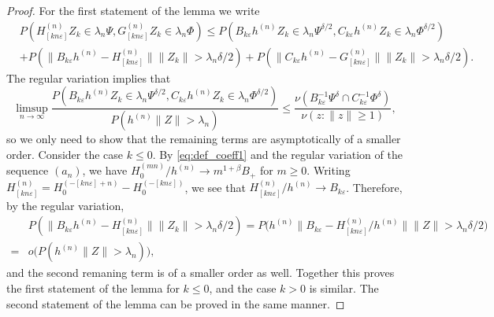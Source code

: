 \documentclass[11pt,reqno]{amsart}
\numberwithin{equation}{section}
\theoremstyle{definition}
\theoremstyle{remark}
\theoremstyle{definition}
\newcommand{\eps}{\varepsilon}
\begin{document}
 
\begin{proof}
For the first statement of the lemma we write 
         \begin{align*}
             & P(H_{[kn\eps]}^{(n)}Z_k \in \lambda_n \Psi, G_{[kn\eps]}^{(n)} Z_k \in \lambda_n \Phi) \leq P(B_{k\eps}
            h^{(n)} Z_k \in \lambda_n \Psi^{\delta/2}, C_{k\eps}h^{(n)}Z_k \in \lambda_n \Phi^{\delta/2})\\
            & + P(\|B_{k\eps}
              h^{(n)} - H_{[kn\eps]}^{(n)}\| \|Z_k\| > \lambda_n
              \delta/2) + P( \|C_{k\eps} h^{(n)} - G_{[kn\eps]}^{(n)}\| \|Z_k\| > \lambda_n \delta/2). 
        \end{align*}
The regular variation implies that 
$$\limsup_{n\to\infty}\frac{P(B_{k\eps}h^{(n)}Z_k\in \lambda_n \Psi^{\delta/2}, C_{k\eps}h^{(n)}Z_k \in \lambda_n \Phi ^{\delta/2})}{P(h^{(n)}
  \|Z\|> \lambda_n)} \leq \frac{\nu(B_{k\eps}^{-1}
  \Psi^{\delta} \cap C_{k\eps}^{-1}\Phi^{\delta})}{\nu(z: \|z\|\geq 1)}, $$
so we only need to show that the remaining terms are asymptotically of a
smaller order. Consider the case $k\leq 0$. By 
 \eqref{eq:def_coeff1} and the regular variation of
the sequence $(a_n)$,  we have $H_0^{(mn)}/h^{(n)}\to
m^{1+\beta}B_+$ for  $m\geq 0$. Writing 
$H_{[kn\eps]}^{(n)} =   H_0^{(-[kn\eps]+ n)} - H_0^{(-[kn\eps])}$, we see that
$H_{[kn\eps]}^{(n)} /h^{(n)}\to B_{k\eps}$. Therefore, by the regular
variation, 
\begin{align*}
&P(\|B_{k\eps}
              h^{(n)} - H_{[kn\eps]}^{(n)}\| \|Z_k\| > \lambda_n
              \delta/2) = P\bigl( h^{(n)}\| B_{k\eps}-H_{[kn\eps]}^{(n)} /h^{(n)}\|\|Z\|>\lambda_n
              \delta/2\bigr) \\
=&o\bigl( P(h^{(n)}
  \|Z\|> \lambda_n)\bigr),
\end{align*}         
and the second remaning term is of a smaller order as well.  Together
this proves the first statement of the lemma for $k\leq 0$, and the
case $k>0$ is similar. The second statement of the lemma can be proved
in the same manner.  
     
\end{proof}
\end{document}

